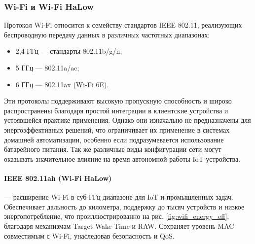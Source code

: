 \documentclass[a4paper,12pt]{article}
\begin{document}
\subsubsection{Wi-Fi и Wi-Fi HaLow}

Протокол Wi-Fi относится к семейству стандартов IEEE 802.11, реализующих беспроводную передачу данных в различных частотных диапазонах:
\begin{itemize}
    \item 2{,}4 ГГц — стандарты 802.11b/g/n;
    \item 5 ГГц — 802.11a/ac;
    \item 6 ГГц — 802.11ax (Wi-Fi 6E).
\end{itemize}
Эти протоколы поддерживают высокую пропускную способность и широко распространены благодаря простой интеграции в клиентские устройства и устоявшейся практике применения. Однако они изначально не предназначены для энергоэффективных решений, что ограничивает их применение в системах домашней автоматизации, особенно если подразумевается использование батарейного питания. Так же различные виды конфигурации сети могут оказывать значительное влияние на время автономной работы IoT-устройства. \cite{WifiSmartHome}

\paragraph{IEEE 802.11ah (Wi-Fi HaLow)} — расширение Wi-Fi в суб-ГГц диапазоне для IoT и промышленных задач. Обеспечивает дальность до километра, поддержку до тысяч устройств и низкое энергопотребление, что проиллюстрированно на рис.  \ref{fig:wifi_energy_eff}, благодаря механизмам Target Wake Time и RAW. Сохраняет уровень MAC совместимым с Wi-Fi, унаследовав безопасность и QoS.
\end{document}

